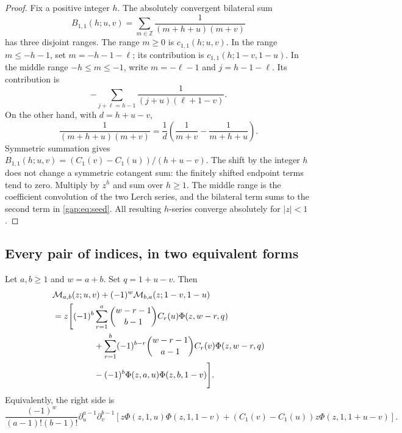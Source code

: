 \begin{proof}
Fix a positive integer $h$. The absolutely convergent bilateral sum
\[
 B_{1,1}(h;u,v)=\sum_{m\in\mathbb Z}
       \frac1{(m+h+u)(m+v)}
\]
has three disjoint ranges. The range $m\geq0$ is $c_{1,1}(h;u,v)$.
In the range $m\leq-h-1$, set $m=-h-1-\ell$; its contribution is
$c_{1,1}(h;1-v,1-u)$. In the middle range $-h\leq m\leq-1$, write
$m=-\ell-1$ and $j=h-1-\ell$. Its contribution is
\[
 -\sum_{j+\ell=h-1}\frac1{(j+u)(\ell+1-v)}.
\]
On the other hand, with $d=h+u-v$,
\[
 \frac1{(m+h+u)(m+v)}
 =\frac1d\left(\frac1{m+v}-\frac1{m+h+u}\right).
\]
Symmetric summation gives
$B_{1,1}(h;u,v)=(C_1(v)-C_1(u))/(h+u-v)$.
The shift by the integer $h$ does not change a symmetric cotangent
sum: the finitely shifted endpoint terms tend to zero. Multiply by
$z^h$ and sum over $h\geq1$. The middle range is the coefficient
convolution of the two Lerch series, and the bilateral term sums to
the second term in \eqref{gap:eq:seed}. All resulting $h$-series
converge absolutely for $|z|<1$.
\end{proof}

\subsection{Every pair of indices, in two equivalent forms}

\begin{theorem}\label{gap:thm:all}
Let $a,b\geq1$ and $w=a+b$. Set $q=1+u-v$. Then
\begin{align}
 &\mathcal M_{a,b}(z;u,v)
      +(-1)^w\mathcal M_{b,a}(z;1-v,1-u)\notag\\
 &=z\Bigg[
 (-1)^b\sum_{r=1}^{a}\binom{w-r-1}{b-1}
       C_r(u)\Phi(z,w-r,q)\notag\\
 &\hspace{17mm}
 +\sum_{r=1}^{b}(-1)^{b-r}\binom{w-r-1}{a-1}
       C_r(v)\Phi(z,w-r,q)\notag\\
 &\hspace{17mm}
 -(-1)^b\Phi(z,a,u)\Phi(z,b,1-v)\Bigg].
 \label{gap:eq:all}
\end{align}
Equivalently, the right side is
\begin{equation}\label{gap:eq:all-derivative}
 \frac{(-1)^w}{(a-1)!(b-1)!}
 \partial_u^{a-1}\partial_v^{b-1}
 \left[
 z\Phi(z,1,u)\Phi(z,1,1-v)
 +(C_1(v)-C_1(u))z\Phi(z,1,1+u-v)
 \right].
\end{equation}
\end{theorem}

